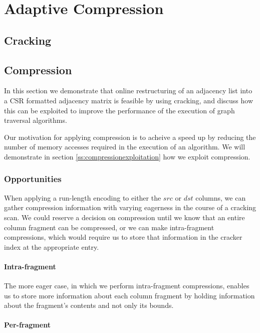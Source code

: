 \chapter{Adaptive Compression}

\label{ch:adaptivecompression}

\section{Cracking}

\section{Compression}

In this section we demonstrate that online restructuring of an adjacency list into a CSR formatted 
adjacency matrix is feasible by using cracking, and discuss how this can be exploited to improve the
performance of the execution of graph traversal algorithms.

Our motivation for applying compression is to acheive a speed up by reducing the number of memory
accesses required in the execution of an algorithm. We will demonstrate in section
\ref{ss:compressionexploitation} how we exploit compression.

\subsection{Opportunities}

When applying a run-length encoding to either the $src$ or $dst$ columns, we can gather compression
information with varying eagerness in the course of a cracking scan. We could reserve a decision on
compression until we know that an entire column fragment can be compressed, or we can make
intra-fragment compressions, which would require us to store that information in the cracker index
at the appropriate entry.

\subsubsection{Intra-fragment}

The more eager case, in which we perform intra-fragment compressions, enables us to store more information about each column fragment by holding information about the fragment's contents and not
only its bounds.

\subsubsection{Per-fragment}


